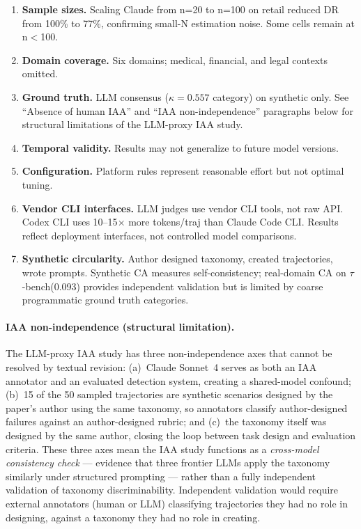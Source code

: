 \documentclass[11pt]{article}
\newcommand{\taubench}{$\tau$-bench\xspace}
\begin{document}
\begin{enumerate}[leftmargin=2em,itemsep=2pt]
  \item \textbf{Sample sizes.} Scaling Claude from n=20 to n=100 on
    retail reduced DR from 100\% to 77\%, confirming small-N estimation
    noise. Some cells remain at n$<$100.
  \item \textbf{Domain coverage.} Six domains; medical, financial, and
    legal contexts omitted.
  \item \textbf{Ground truth.} LLM consensus ($\kappa = 0.557$ category)
    on synthetic only. See ``Absence of human IAA'' and ``IAA
    non-independence'' paragraphs below for structural limitations of
    the LLM-proxy IAA study.
  \item \textbf{Temporal validity.} Results may not generalize to future
    model versions.
  \item \textbf{Configuration.} Platform rules represent reasonable
    effort but not optimal tuning.
  \item \textbf{Vendor CLI interfaces.} LLM judges use vendor CLI tools,
    not raw API. Codex CLI uses 10--15$\times$ more tokens/traj than
    Claude Code CLI. Results reflect deployment interfaces, not
    controlled model comparisons.
  \item \textbf{Synthetic circularity.} Author designed taxonomy, created
    trajectories, wrote prompts. Synthetic CA measures self-consistency;
    real-domain CA on \taubench (0.093) provides independent validation
    but is limited by coarse programmatic ground truth categories.
\end{enumerate}

\paragraph{IAA non-independence (structural limitation).}
The LLM-proxy IAA study has three non-independence axes that cannot be
resolved by textual revision: (a)~Claude Sonnet~4 serves as both an
IAA annotator and an evaluated detection system, creating a shared-model
confound; (b)~15 of the 50 sampled trajectories are synthetic scenarios
designed by the paper's author using the same taxonomy, so annotators
classify author-designed failures against an author-designed rubric;
and (c)~the taxonomy itself was designed by the same author, closing
the loop between task design and evaluation criteria. These three axes
mean the IAA study functions as a \emph{cross-model consistency check}
--- evidence that three frontier LLMs apply the taxonomy similarly under
structured prompting --- rather than a fully independent validation of
taxonomy discriminability. Independent validation would require external
annotators (human or LLM) classifying trajectories they had no role in
designing, against a taxonomy they had no role in creating.
\end{document}
